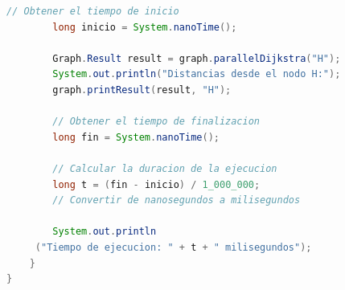 \begin{lstlisting}[language=Java, style=ColorStyle]
        // Obtener el tiempo de inicio
	    long inicio = System.nanoTime();
	    		  
        Graph.Result result = graph.parallelDijkstra("H");
        System.out.println("Distancias desde el nodo H:");
        graph.printResult(result, "H");
        
        // Obtener el tiempo de finalizacion
	    long fin = System.nanoTime();
	      
	    // Calcular la duracion de la ejecucion
	    long t = (fin - inicio) / 1_000_000; 
	    // Convertir de nanosegundos a milisegundos
	      
	    System.out.println
     ("Tiempo de ejecucion: " + t + " milisegundos");
    }
}

\end{lstlisting}
	
